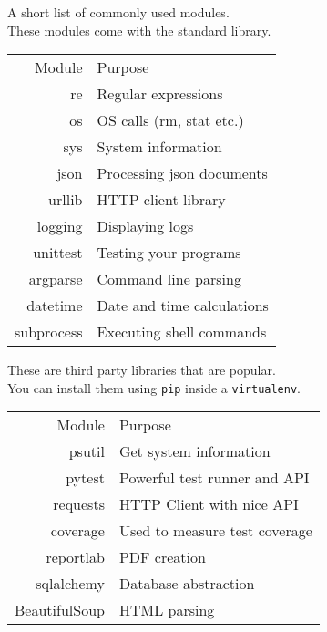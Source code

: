 A short list of commonly used modules. \\

These modules come with the standard library.
\begin{tabular}[t]{| r | l |}
\hline
\cellcolor[gray]{0.9} Module & \cellcolor[gray]{0.9} Purpose \\
  re & Regular expressions \\
  os & OS calls (rm, stat etc.)\\
  sys & System information  \\
  json & Processing json documents \\
  urllib & HTTP client library \\
  logging & Displaying logs \\
  unittest & Testing your programs \\
  argparse & Command line parsing \\
  datetime & Date and time calculations \\
  subprocess & Executing shell commands \\

\hline
\end{tabular}

These are third party libraries that are popular. \\
You can install them using \texttt{pip} inside a \texttt{virtualenv}.
\begin{tabular}[t]{| r | l |}
\hline
\cellcolor[gray]{0.9} Module & \cellcolor[gray]{0.9} Purpose \\
  psutil & Get system information \\
  pytest & Powerful test runner and API \\
  requests & HTTP Client with nice API \\
  coverage & Used to measure test coverage \\
  reportlab & PDF creation \\
  sqlalchemy & Database abstraction \\
  BeautifulSoup & HTML parsing \\
\hline
\end{tabular}




